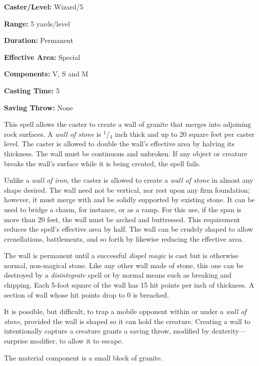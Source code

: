 \begin{multicols}{2}
\begin{minipage}{\columnwidth}
\noindent \textbf{Caster/Level:} Wizard/5

\noindent \textbf{Range:} 5 yards/level

\noindent \textbf{Duration:} Permanent

\noindent \textbf{Effective Area:} Special

\noindent \textbf{Components:} V, S and M

\noindent \textbf{Casting Time:} 5

\noindent \textbf{Saving Throw:} None

\end{minipage}

This spell allows the caster to create a wall of granite that merges into adjoining rock surfaces.  A \textit{wall of stone} is $^1$/$_4$ inch thick and up to 20 square feet per caster level.  The caster is allowed to double the wall's effective area by halving its thickness.  The wall must be continuous and unbroken.  If any object or creature breaks the wall's surface while it is being created, the spell fails.   

Unlike a \textit{wall of iron}, the caster is allowed to create a \textit{wall of stone} in almost any shape desired.  The wall need not be vertical, nor rest upon any firm foundation; however, it must merge with and be solidly supported by existing stone.  It can be used to bridge a chasm, for instance, or as a ramp.  For this use, if the span is more than 20 feet, the wall must be arched and buttressed.  This requirement reduces the spell's effective area by half.  The wall can be crudely shaped to allow crenellations, battlements, and so forth by likewise reducing the effective area. 

The wall is permanent until a successful \textit{dispel magic} is cast but is otherwise normal, non-magical stone.  Like any other wall made of stone, this one can be destroyed by a \textit{disintegrate} spell or by normal means such as breaking and chipping.  Each 5-foot square of the wall has 15 hit points per inch of thickness.   A section of wall whose hit points drop to 0 is breached.  

It is possible, but difficult, to trap a mobile opponent within or under a \textit{wall of stone}, provided the wall is shaped so it can hold the creature.  Creating a wall to intentionally capture a creature grants a saving throw, modified by dexterity---surprise modifier, to allow it to escape.

The material component is a small block of granite.


\end{multicols}
